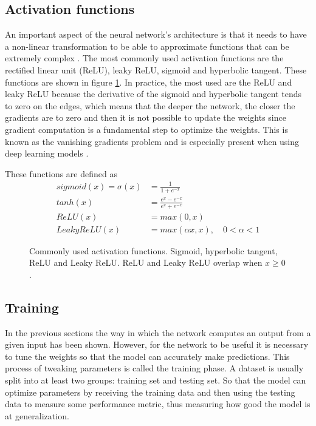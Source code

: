 \subsection{Activation functions}

An important aspect of the neural network's architecture is that it needs to have a non-linear transformation to be able to approximate functions that can be extremely complex \cite{Hornik, Cybenko}. The most commonly used activation functions are the rectified linear unit (ReLU), leaky ReLU, sigmoid and hyperbolic tangent. These functions are shown in figure \ref{fig:activations}. In practice, the most used are the ReLU and leaky ReLU because the derivative of the sigmoid and hyperbolic tangent tends to zero on the edges, which means that the deeper the network, the closer the gradients are to zero and then it is not possible to update the weights since gradient computation is a fundamental step to optimize the weights. This is known as the vanishing gradients problem and is especially present when using deep learning models \cite{vanishing-gradient, Hinton2010}.

These functions are defined as
\begin{align*}
    sigmoid(x)=\sigma(x) &= \frac{1}{1+e^{-x}} \\
    tanh(x) &= \frac{e^x-e^{-x}}{e^x+e^{-x}} \\
    ReLU(x) &= max(0,x)\\
    LeakyReLU(x) &= max(\alpha x, x),\quad 0<\alpha < 1
\end{align*}
\begin{figure}
    \centering
    
    \caption[Commonly used activation functions]{Commonly used activation functions. Sigmoid, hyperbolic tangent, ReLU and Leaky ReLU. ReLU and Leaky ReLU overlap when $x\geq0$.}
   \label{fig:activations}
\end{figure}

\subsection{Training}
In the previous sections the way in which the network computes an output from a given input has been shown. However, for the network to be useful it is necessary to tune the weights so that the model can accurately make predictions. This process of tweaking parameters is called the training phase. A dataset is usually split into at least two groups: training set and testing set. So that the model can optimize parameters by receiving the training data and then using the testing data to measure some performance metric, thus measuring how good the model is at generalization.

